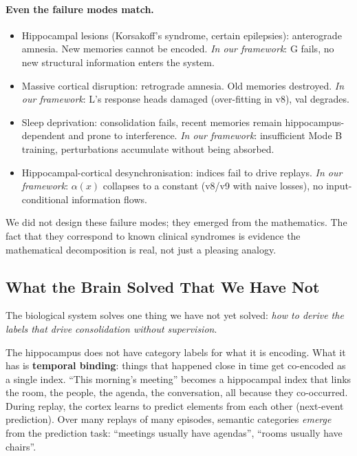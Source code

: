 \documentclass[11pt, a4paper]{article}
\theoremstyle{plain}
\theoremstyle{definition}
\theoremstyle{remark}
\begin{document}
\paragraph{Even the failure modes match.}
\begin{itemize}[nosep]
\item Hippocampal lesions (Korsakoff's syndrome, certain epilepsies): anterograde amnesia. New memories cannot be encoded. \emph{In our framework}: G fails, no new structural information enters the system.
\item Massive cortical disruption: retrograde amnesia. Old memories destroyed. \emph{In our framework}: L's response heads damaged (over-fitting in v8), val degrades.
\item Sleep deprivation: consolidation fails, recent memories remain hippocampus-dependent and prone to interference. \emph{In our framework}: insufficient Mode B training, perturbations accumulate without being absorbed.
\item Hippocampal-cortical desynchronisation: indices fail to drive replays. \emph{In our framework}: $\alpha(x)$ collapses to a constant (v8/v9 with naive losses), no input-conditional information flows.
\end{itemize}

We did not design these failure modes; they emerged from the mathematics.
The fact that they correspond to known clinical syndromes is evidence the mathematical decomposition is real, not just a pleasing analogy.

\subsection{What the Brain Solved That We Have Not}

The biological system solves one thing we have not yet solved: \emph{how to derive the labels that drive consolidation without supervision}.

The hippocampus does not have category labels for what it is encoding.
What it has is \textbf{temporal binding}: things that happened close in time get co-encoded as a single index.
``This morning's meeting'' becomes a hippocampal index that links the room, the people, the agenda, the conversation, all because they co-occurred.
During replay, the cortex learns to predict elements from each other (next-event prediction).
Over many replays of many episodes, semantic categories \emph{emerge} from the prediction task: ``meetings usually have agendas'', ``rooms usually have chairs''.
\end{document}
